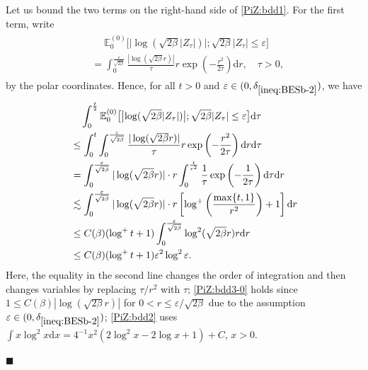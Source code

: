 \documentclass[12pt, twoside]{article}
\numberwithin{figure}{section}
\newcommand{\less}{\lesssim}
\newcommand{\1}{\mathds 1}
\newcommand{\vep}{{\varepsilon}}
\newcommand{\E}{{\mathbb E}}
\renewcommand{\d}{{\mathrm d}}
\newcommand{\2}{{\mathbf 1}}
\renewenvironment{proof}[1][\proofname]{\noindent {\bfseries #1.}\;}{\hfill\ensuremath{\blacksquare}\\}
\newcommand{\deltaz}{\delta_{\ref{ineq:BESb-2}}}
\begin{document}
\begin{proof}[Proof of Lemma~\ref{lem:PiZbdd}]
Let us bound the two terms on the right-hand side of \eqref{PiZ:bdd1}. For the first term, write
\begin{align}
\begin{split}
&\quad\;\E^{(0)}_0\bigl[\bigl|\log (\sqrt{2\beta}|Z_\tau|)\bigr|;\sqrt{2\beta}|Z_\tau|\leq \vep\bigr]\\
&=\int_0^{\frac{\vep}{\sqrt{2\beta}}} \frac{|\log (\sqrt{2\beta}r)|}{\tau}r\exp\left(-\frac{r^2}{2\tau}\right)\d r,\quad \tau>0,\label{logB:polar}
\end{split}
\end{align}
by the polar coordinates.  Hence, for all $t>0$ and $\vep\in (0,\deltaz)$, we have
\begin{align}
&\quad\int_0^{\frac{t}{2}} \E^{(0)}_0\bigl[\bigl|\log (\sqrt{2\beta}|Z_{\tau}|)\bigr|;\sqrt{2\beta}|Z_{\tau}|\leq \vep\bigr]\d \tau\notag\\
&\leq 
\int_0^t  \int_0^{\frac{\vep}{\sqrt{2\beta}}}\frac{|\log (\sqrt{2\beta}r)|}{\tau}r\exp\left(-\frac{r^2}{2\tau}\right) \d r\d \tau\notag\\
&=\int_0^{\frac{\vep}{\sqrt{2\beta}}} |\log (\sqrt{2\beta}r)|\cdot r\int_0^{\frac{t}{r^2}}\frac{1}{\tau}\exp\left(-\frac{1}{2\tau}\right)\d \tau\d r\notag\\
&\less \int_0^{\frac{\vep}{\sqrt{2\beta}}} |\log (\sqrt{2\beta}r)|\cdot r\left[\log^+\left(\frac{\max\{t,1\}}{r^2}\right)+1\right] \d r\notag\\
&\leq C(\beta)(\log^+t+1)\int_0^{\frac{\vep}{\sqrt{2\beta}}}\log^2 (\sqrt{2\beta}r)r\d r\label{PiZ:bdd3-0}\\
&\leq C(\beta)(\log^+t+1)\vep^2\log^2\vep.\label{PiZ:bdd2}
\end{align}
Here, the equality in the second line changes the order of integration and then changes variables by replacing $\tau/r^2$ with $\tau$;
\eqref{PiZ:bdd3-0} holds since $1\leq C(\beta) |\log (\sqrt{2\beta}r)|$ for $0<r\leq \vep/\sqrt{2\beta}$ due to the assumption $\vep\in (0,\deltaz)$; \eqref{PiZ:bdd2} uses
$\int x\log^2 x\d x=4^{-1}x^2(2\log^2 x-2\log x+1)+C$, $x>0$.


\end{proof}
\end{document}
